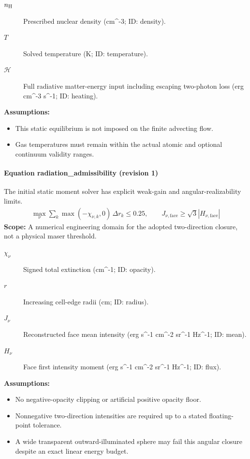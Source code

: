 \begin{description}
\item[$n_{\rm H}$] Prescribed nuclear density (cm\textasciicircum{}-3; ID: density).
\item[$T$] Solved temperature (K; ID: temperature).
\item[$\mathcal H$] Full radiative matter-energy input including escaping two-photon loss (erg cm\textasciicircum{}-3 s\textasciicircum{}-1; ID: heating).
\end{description}

\noindent\textbf{Assumptions:}
\begin{itemize}
\item This static equilibrium is not imposed on the finite advecting flow.
\item Gas temperatures must remain within the actual atomic and optional continuum validity ranges.
\end{itemize}

\paragraph{Equation radiation\_admissibility (revision 1)}
The initial static moment solver has explicit weak-gain and angular-realizability limits.
\begin{equation}
\begin{aligned}
\max_\nu\sum_k\max(-\chi_{\nu,k},0)\,\Delta r_k\le0.25,\qquad J_{\nu,\mathrm{face}}\ge\sqrt3|H_{\nu,\mathrm{face}}|
\end{aligned}
\label{eq:escape.coupled_5f_hydrogen:radiation_5f_admissibility:1}
\end{equation}
\noindent\textbf{Scope:} A numerical engineering domain for the adopted two-direction closure, not a physical maser threshold.

\begin{description}
\item[$\chi_\nu$] Signed total extinction (cm\textasciicircum{}-1; ID: opacity).
\item[$r$] Increasing cell-edge radii (cm; ID: radius).
\item[$J_\nu$] Reconstructed face mean intensity (erg s\textasciicircum{}-1 cm\textasciicircum{}-2 sr\textasciicircum{}-1 Hz\textasciicircum{}-1; ID: mean).
\item[$H_\nu$] Face first intensity moment (erg s\textasciicircum{}-1 cm\textasciicircum{}-2 sr\textasciicircum{}-1 Hz\textasciicircum{}-1; ID: flux).
\end{description}

\noindent\textbf{Assumptions:}
\begin{itemize}
\item No negative-opacity clipping or artificial positive opacity floor.
\item Nonnegative two-direction intensities are required up to a stated floating-point tolerance.
\item A wide transparent outward-illuminated sphere may fail this angular closure despite an exact linear energy budget.
\end{itemize}
